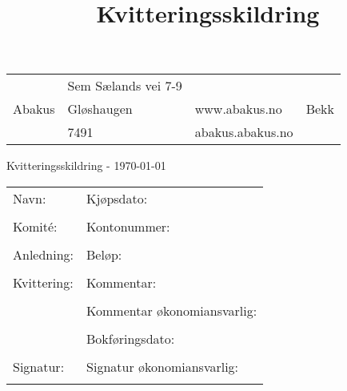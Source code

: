 \documentclass{article}
\title{Kvitteringsskildring}
\author{
}
\begin{document}
\begin{tabularx}{\textwidth}{XXXX}
 & Sem Sælands vei 7-9 &  &  \\
Abakus & Gløshaugen & www.abakus.no & Bekk \\
 & 7491 & abakus.abakus.no &  \\
\end{tabularx}


{\huge Kvitteringsskildring - \today}

\begin{tabularx}{\textwidth}{|X|X|}
\cline{1-2}
Navn: & Kjøpsdato: \\
& 
\\ \cline{1-2}
Komité: & Kontonummer: \\
& 
\\ \cline{1-2}
Anledning: & Beløp: \\
& 
\\ \cline{1-2}
Kvittering: & Kommentar: \\
 & %
 \\ \cline{2-2}
 & Kommentar økonomiansvarlig: \\
 & %
 \\ \cline{2-2}
 & Bokføringsdato: \\
 & %
 \\ \cline{1-2}
Signatur: & Signatur økonomiansvarlig: \\
& 
\\ \cline{1-2}
\end{tabularx}



\end{document}
